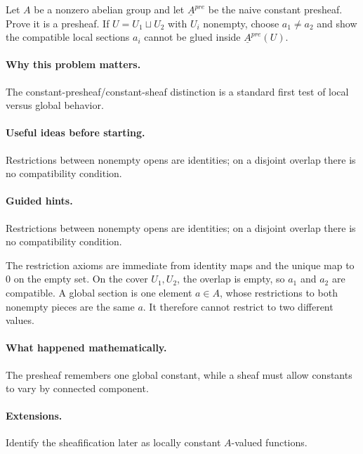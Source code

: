\begin{problem}
Let $A$ be a nonzero abelian group and let $\underline A^{pre}$ be the naive constant presheaf.  Prove it is a presheaf.  If $U=U_1\sqcup U_2$ with $U_i$ nonempty, choose $a_1\ne a_2$ and show the compatible local sections $a_i$ cannot be glued inside $\underline A^{pre}(U)$.
\end{problem}

\paragraph{Why this problem matters.}
The constant-presheaf/constant-sheaf distinction is a standard first test of local versus global behavior.

\paragraph{Useful ideas before starting.}
Restrictions between nonempty opens are identities; on a disjoint overlap there is no compatibility condition.

\paragraph{Guided hints.}
Restrictions between nonempty opens are identities; on a disjoint overlap there is no compatibility condition.

\begin{solution}
The restriction axioms are immediate from identity maps and the unique map to $0$ on the empty set.  On the cover $U_1,U_2$, the overlap is empty, so $a_1$ and $a_2$ are compatible.  A global section is one element $a\in A$, whose restrictions to both nonempty pieces are the same $a$.  It therefore cannot restrict to two different values.
\end{solution}

\paragraph{What happened mathematically.}
The presheaf remembers one global constant, while a sheaf must allow constants to vary by connected component.

\paragraph{Extensions.}
Identify the sheafification later as locally constant $A$-valued functions.
